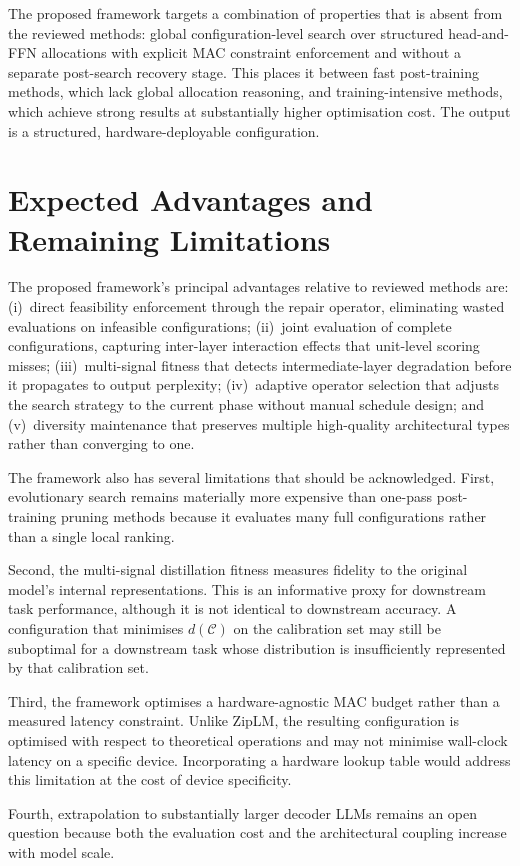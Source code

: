 The proposed framework targets a combination of properties that is absent from the reviewed methods: global configuration-level search over structured head-and-FFN allocations with explicit MAC constraint enforcement and without a separate post-search recovery stage. This places it between fast post-training methods, which lack global allocation reasoning, and training-intensive methods, which achieve strong results at substantially higher optimisation cost. The output is a structured, hardware-deployable configuration.

\section{Expected Advantages and Remaining Limitations}
\label{subsec:design_limitations}

The proposed framework's principal advantages relative to reviewed methods are: (i)~direct feasibility enforcement through the repair operator, eliminating wasted evaluations on infeasible configurations; (ii)~joint evaluation of complete configurations, capturing inter-layer interaction effects that unit-level scoring misses; (iii)~multi-signal fitness that detects intermediate-layer degradation before it propagates to output perplexity; (iv)~adaptive operator selection that adjusts the search strategy to the current phase without manual schedule design; and (v)~diversity maintenance that preserves multiple high-quality architectural types rather than converging to one.

The framework also has several limitations that should be acknowledged. First, evolutionary search remains materially more expensive than one-pass post-training pruning methods because it evaluates many full configurations rather than a single local ranking.

Second, the multi-signal distillation fitness measures fidelity to the original model's internal representations. This is an informative proxy for downstream task performance, although it is not identical to downstream accuracy. A configuration that minimises $d(\mathcal{C})$ on the calibration set may still be suboptimal for a downstream task whose distribution is insufficiently represented by that calibration set.

Third, the framework optimises a hardware-agnostic MAC budget rather than a measured latency constraint. Unlike ZipLM, the resulting configuration is optimised with respect to theoretical operations and may not minimise wall-clock latency on a specific device. Incorporating a hardware lookup table would address this limitation at the cost of device specificity.

Fourth, extrapolation to substantially larger decoder LLMs remains an open question because both the evaluation cost and the architectural coupling increase with model scale.
\fi
